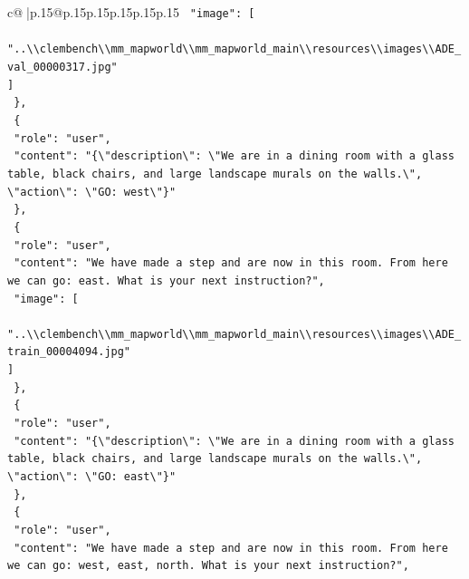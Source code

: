 \documentclass{article}
\begin{document}
{\begin{supertabular}{c@{$\;$}|p{.15\linewidth}@{}p{.15\linewidth}p{.15\linewidth}p{.15\linewidth}p{.15\linewidth}p{.15\linewidth}}
{{{\texttt{    "image": {[}} \\
\texttt{      "..\textbackslash{}\textbackslash{}clembench\textbackslash{}\textbackslash{}mm\_mapworld\textbackslash{}\textbackslash{}mm\_mapworld\_main\textbackslash{}\textbackslash{}resources\textbackslash{}\textbackslash{}images\textbackslash{}\textbackslash{}ADE\_val\_00000317.jpg"} \\
\texttt{    {]}} \\
\texttt{  \},} \\
\texttt{  \{} \\
\texttt{    "role": "user",} \\
\texttt{    "content": "\{\textbackslash{}"description\textbackslash{}": \textbackslash{}"We are in a dining room with a glass table, black chairs, and large landscape murals on the walls.\textbackslash{}", \textbackslash{}"action\textbackslash{}": \textbackslash{}"GO: west\textbackslash{}"\}"} \\
\texttt{  \},} \\
\texttt{  \{} \\
\texttt{    "role": "user",} \\
\texttt{    "content": "We have made a step and are now in this room. From here we can go: east. What is your next instruction?",} \\
\texttt{    "image": {[}} \\
\texttt{      "..\textbackslash{}\textbackslash{}clembench\textbackslash{}\textbackslash{}mm\_mapworld\textbackslash{}\textbackslash{}mm\_mapworld\_main\textbackslash{}\textbackslash{}resources\textbackslash{}\textbackslash{}images\textbackslash{}\textbackslash{}ADE\_train\_00004094.jpg"} \\
\texttt{    {]}} \\
\texttt{  \},} \\
\texttt{  \{} \\
\texttt{    "role": "user",} \\
\texttt{    "content": "\{\textbackslash{}"description\textbackslash{}": \textbackslash{}"We are in a dining room with a glass table, black chairs, and large landscape murals on the walls.\textbackslash{}", \textbackslash{}"action\textbackslash{}": \textbackslash{}"GO: east\textbackslash{}"\}"} \\
\texttt{  \},} \\
\texttt{  \{} \\
\texttt{    "role": "user",} \\
\texttt{    "content": "We have made a step and are now in this room. From here we can go: west, east, north. What is your next instruction?",} \\
}}}
\end{supertabular}}
\end{document}
